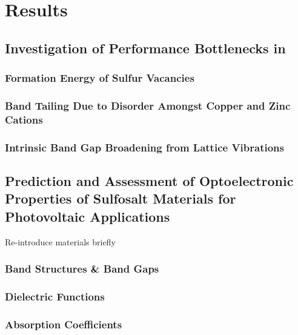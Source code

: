 \chapter{Results}
\section{Investigation of Performance Bottlenecks in \CZTS}
\subsection{Formation Energy of Sulfur Vacancies}
\subsection{Band Tailing Due to Disorder Amongst Copper and Zinc Cations}
\subsection{Intrinsic Band Gap Broadening from Lattice Vibrations}
 
\section{Prediction and Assessment of Optoelectronic Properties of Sulfosalt Materials for Photovoltaic Applications}
Re-introduce materials briefly
\subsection{Band Structures \& Band Gaps}
\subsection{Dielectric Functions}
\subsection{Absorption Coefficients}